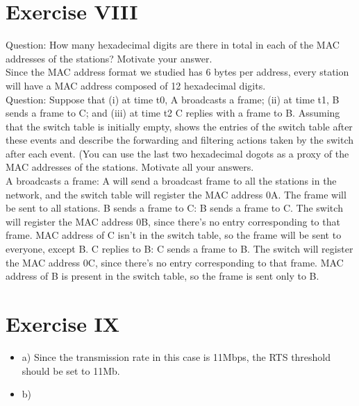 \documentclass[11pt]{article}
\begin{document}
	\section*{Exercise VIII}
	Question:
	How many hexadecimal digits are there in total in each of the MAC addresses of the stations? Motivate your answer.\\
	Since the MAC address format we studied has 6 bytes per address, every station will have a MAC address composed of 12 hexadecimal digits.\\
	Question:
	Suppose that (i) at time t0, A broadcasts a frame; (ii) at time t1, B sends a frame to C; and (iii) at time t2 C replies with a frame to B. Assuming that the switch table is initially empty, shows the entries of the switch table after these events and describe the forwarding and filtering actions taken by the switch after each event. (You can use the last two hexadecimal dogots as a proxy of the MAC addresses of the stations. Motivate all your answers.\\
	A broadcasts a frame: A will send a broadcast frame to all the stations in the network, and the switch table will register the MAC address 0A. The frame will be sent to all stations.
	B sends a frame to C: B sends a frame to C. The switch will register the MAC address 0B, since there's no entry corresponding to that frame. MAC address of C isn't in the switch table, so the frame will be sent to everyone, except B.
	C replies to B: C sends a frame to B. The switch will register the MAC address 0C, since there's no entry corresponding to that frame. MAC address of B is present in the switch table, so the frame is sent only to B.
	\section*{Exercise IX}
	\begin{itemize}
		\item{a)} Since the transmission rate in this case is 11Mbps, the RTS threshold should be set to 11Mb.
		\item{b)} 
	\end{itemize}
\end{document}
